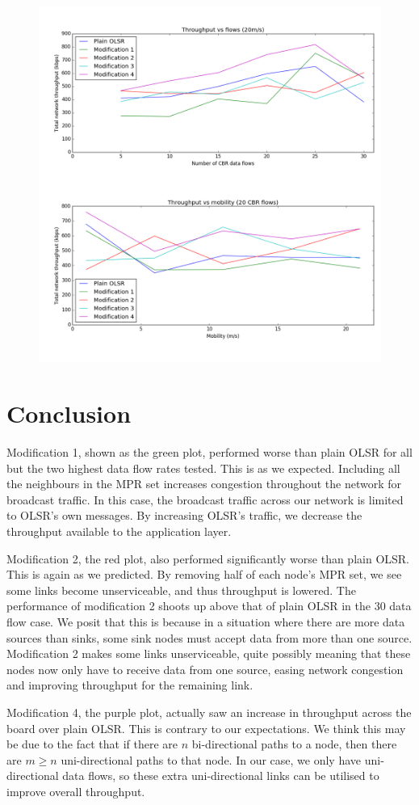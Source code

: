 \documentclass[12pt,a4paper]{article}
\begin{document}
\begin{figure}[ht]
\centering
\includegraphics[width=\textwidth]{figure_1}
\end{figure}

\section{Conclusion}
Modification 1, shown as the green plot, performed worse than plain OLSR for all but the two highest data flow rates tested. This is as we expected. Including all the neighbours in the MPR set increases congestion throughout the network for broadcast traffic. In this case, the broadcast traffic across our network is limited to OLSR's own messages. By increasing OLSR's traffic, we decrease the throughput available to the application layer.

Modification 2, the red plot, also performed significantly worse than plain OLSR. This is again as we predicted. By removing half of each node's MPR set, we see some links become unserviceable, and thus throughput is lowered. The performance of modification 2 shoots up above that of plain OLSR in the 30 data flow case. We posit that this is because in a situation where there are more data sources than sinks, some sink nodes must accept data from more than one source. Modification 2 makes some links unserviceable, quite possibly meaning that these nodes now only have to receive data from one source, easing network congestion and improving throughput for the remaining link.

Modification 4, the purple plot, actually saw an increase in throughput across the board over plain OLSR. This is contrary to our expectations. We think this may be due to the fact that if there are \(n\) bi-directional paths to a node, then there are \(m \geq n\) uni-directional paths to that node. In our case, we only have uni-directional data flows, so these extra uni-directional links can be utilised to improve overall throughput.



\end{document}
